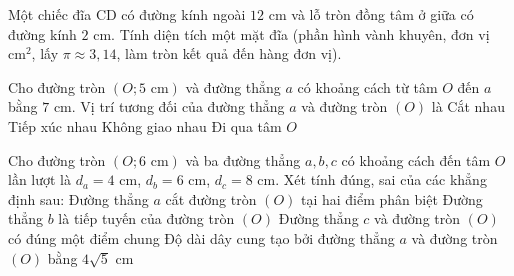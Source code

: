 \begin{bt}%
	Một chiếc đĩa CD có đường kính ngoài $12\text{ cm}$ và lỗ tròn đồng tâm ở giữa có đường kính $2\text{ cm}$. Tính diện tích một mặt đĩa (phần hình vành khuyên, đơn vị $\text{cm}^2$, lấy $\pi \approx 3{,}14$, làm tròn kết quả đến hàng đơn vị).
\end{bt}



\begin{ex}%
	Cho đường tròn $(O; 5\text{ cm})$ và đường thẳng $a$ có khoảng cách từ tâm $O$ đến $a$ bằng $7\text{ cm}$. Vị trí tương đối của đường thẳng $a$ và đường tròn $(O)$ là
	\choice
	{Cắt nhau}
	{Tiếp xúc nhau}
	{\True Không giao nhau}
	{Đi qua tâm $O$}
\end{ex}

\begin{ex}%
	Cho đường tròn $(O; 6\text{ cm})$ và ba đường thẳng $a, b, c$ có khoảng cách đến tâm $O$ lần lượt là $d_a = 4\text{ cm}$, $d_b = 6\text{ cm}$, $d_c = 8\text{ cm}$. Xét tính đúng, sai của các khẳng định sau:
	\choiceTF
	{\True Đường thẳng $a$ cắt đường tròn $(O)$ tại hai điểm phân biệt}
	{\True Đường thẳng $b$ là tiếp tuyến của đường tròn $(O)$}
	{Đường thẳng $c$ và đường tròn $(O)$ có đúng một điểm chung}
	{\True Độ dài dây cung tạo bởi đường thẳng $a$ và đường tròn $(O)$ bằng $4\sqrt{5}\text{ cm}$}
\end{ex}

